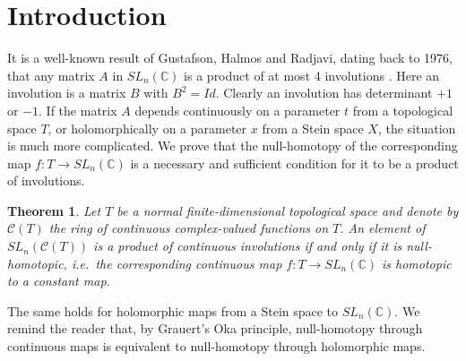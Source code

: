 \documentclass{amsart}
\newcommand{\C}{\mathbb{C}}
\newtheorem{Thm}{Theorem}[section]
\theoremstyle{definition}
\begin{document}
    	\begin{abstract}
		It is a well-known result of Gustafson, Halmos and Radjavi, dating back to 1976, that any matrix $A$ in $SL_n(\mathbb{C})$ is a product of at most 4 involutions. We consider a natural continuous and holomorphic parameter dependence of this result in the spirit of Vaserstein and Gromov.
		Our main result shows that null-homotopy characterizes exactly those matrices in the special linear group over rings of continuous or holomorphic functions that are finite products of involutions. We give an upper bound $I(n, d)$, depending only on the size $n$ of the matrices and the dimension $d$ of the parameter space, for the number of involutions needed in the factorization. Our upper bound is not optimal, however we show that for fixed $n$ the optimal upper bound tends to infinity as $d\to \infty$. In some cases we are able to determine the optimal bound.
	\end{abstract}
	
	
	
	\section{Introduction}

	It is a well-known result of Gustafson, Halmos and Radjavi, dating back to 1976, that any matrix $A$ in $SL_n(\C)$ is a product of at most 4 involutions \cite{MR0399284}. Here an involution is a matrix $B$ with $B^2 = Id$. Clearly an involution has determinant $+1$ or $-1$. If the matrix $A$ depends continuously on a parameter $t$ from a topological space $T$, or holomorphically on a parameter $x$ from a Stein space $X$, the situation is much more complicated. We prove that the null-homotopy of the corresponding map $f: T \to SL_n (\C)$ is a necessary and sufficient condition for it to be a product of involutions.
    
    \begin{Thm}\label{main-continuous} Let $T$ be a normal finite-dimensional topological space and denote by $\mathcal{C}(T)$ the ring of continuous complex-valued functions on $T$. An element of $SL_n (\mathcal{C}(T))$ is a product of continuous  involutions if and only if it is null-homotopic, i.e.\ the corresponding continuous map $f: T \to SL_n (\C)$ is homotopic to a constant map.
    \end{Thm}
    
    The same holds for holomorphic maps from a Stein space to 
    $SL_n(\C)$. We remind the reader that, by Grauert's Oka principle, null-homotopy through continuous maps is equivalent to null-homotopy through holomorphic maps.
\end{document}
